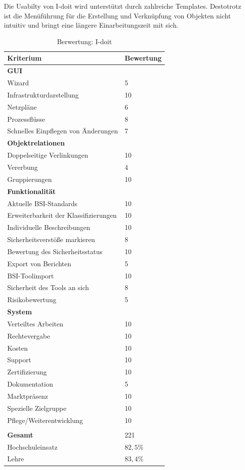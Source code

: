 Die Usabilty von I-doit wird unterstützt durch zahlreiche Templates. Destotrotz ist die Menüführung für die Erstellung und Verknüpfung von Objekten nicht intuitiv und bringt eine 
längere Einarbeitungszeit mit sich.

\begin{table}[h]
\begin{tabular}{|p{}|p{}|}
\hline
Kriterium & Bewertung\\
\hline
\textbf{GUI}& \\
\hline
Wizard & 5 \\
\hline
Infrastrukturdarstellung & 10 \\
\hline
Netzpläne & 6 \\
\hline
Prozessflüsse & 8 \\
\hline
Schnelles Einpflegen von Änderungen & 7 \\
\hline
\textbf{Objektrelationen} &  \\
\hline
Doppelseitige Verlinkungen & 10 \\
\hline
Vererbung & 4 \\
\hline
Gruppierungen & 10 \\
\hline
\textbf{Funktionalität} &\\
\hline
Aktuelle BSI-Standards & 10 \\
\hline
Erweiterbarkeit der Klassifizierungen & 10 \\
\hline
Individuelle Beschreibungen & 10 \\
\hline
Sicherheitsverstöße markieren & 8 \\
\hline
Bewertung des Sicherheitsstatus & 10 \\
\hline
Export von Berichten & 5 \\
\hline
BSI-Toolimport & 10 \\
\hline
Sicherheit des Tools an sich & 8 \\
\hline
Risikobewertung & 5 \\
\hline
\textbf{System}& \\
\hline
Verteiltes Arbeiten & 10 \\
\hline
Rechtevergabe & 10 \\
\hline
Kosten & 10 \\
\hline
Support & 10 \\
\hline
Zertifizierung & 10 \\
\hline
Dokumentation & 5 \\
\hline
Marktpräsenz & 10 \\
\hline
Spezielle Zielgruppe & 10 \\
\hline
Pflege/Weiterentwicklung & 10 \\
\hline
\multicolumn{2}{c}{}\\
\hline
\textbf{Gesamt} & 221\\
\hline
Hochschuleinsatz & $82,5\%$\\
\hline
Lehre & $83,4\%$\\
\hline
\end{tabular}
\caption{Berwertung: I-doit}
\label{tab:BerwertungIdoit}
\end{table}



